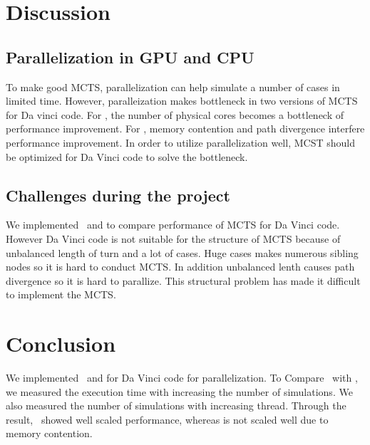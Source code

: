 


\section{Discussion}
\subsection{Parallelization in GPU and CPU}
To make good MCTS, parallelization can help simulate a number of cases in limited time. 
However, paralleization makes bottleneck in two versions of MCTS for Da vinci code.
For \cpu, the number of physical cores becomes a bottleneck of performance improvement.
For \gpu, memory contention and path divergence interfere performance improvement. 
In order to utilize parallelization well, MCST should be optimized for Da Vinci code to solve the bottleneck.

\subsection{Challenges during the project} %
We implemented \cpu~and \gpu to compare performance of MCTS for Da Vinci code. 
However Da Vinci code is not suitable for the structure of MCTS because of unbalanced length of turn and a lot of cases.
Huge cases makes numerous sibling nodes so it is hard to conduct MCTS. 
In addition unbalanced lenth causes path divergence so it is hard to parallize.
This structural problem has made it difficult to implement the MCTS.


\section{Conclusion}
We implemented \cpu~and \gpu for Da Vinci code for parallelization. 
To Compare \cpu~with \gpu, we measured the execution time with increasing the number of simulations.
We also measured the number of simulations with increasing thread. 
Through the result, \cpu~showed well scaled performance, whereas \gpu is not scaled well due to memory contention.


